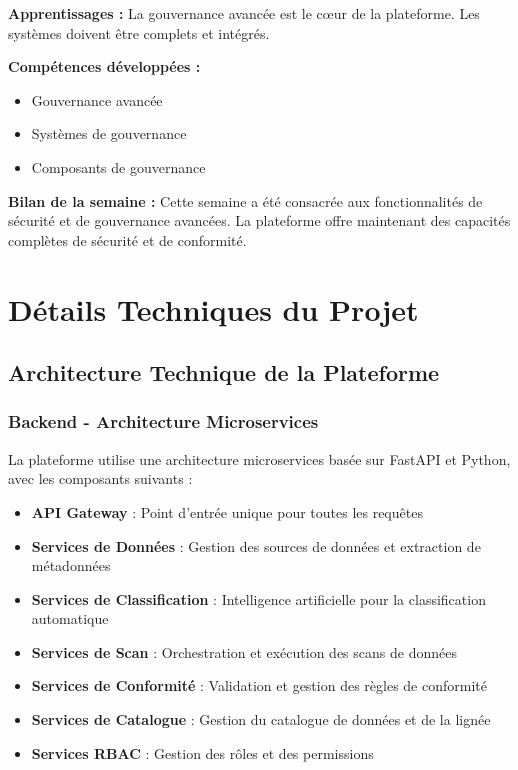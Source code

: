 \documentclass[12pt,a4paper]{article}
\begin{document}
\textbf{Apprentissages :}
La gouvernance avancée est le cœur de la plateforme. Les systèmes doivent être complets et intégrés.

\textbf{Compétences développées :}
\begin{itemize}
    \item Gouvernance avancée
    \item Systèmes de gouvernance
    \item Composants de gouvernance
\end{itemize}

\textbf{Bilan de la semaine :}
Cette semaine a été consacrée aux fonctionnalités de sécurité et de gouvernance avancées. La plateforme offre maintenant des capacités complètes de sécurité et de conformité.


\section{Détails Techniques du Projet}

\subsection{Architecture Technique de la Plateforme}

\subsubsection{Backend - Architecture Microservices}
La plateforme utilise une architecture microservices basée sur FastAPI et Python, avec les composants suivants :

\begin{itemize}
    \item \textbf{API Gateway} : Point d'entrée unique pour toutes les requêtes
    \item \textbf{Services de Données} : Gestion des sources de données et extraction de métadonnées
    \item \textbf{Services de Classification} : Intelligence artificielle pour la classification automatique
    \item \textbf{Services de Scan} : Orchestration et exécution des scans de données
    \item \textbf{Services de Conformité} : Validation et gestion des règles de conformité
    \item \textbf{Services de Catalogue} : Gestion du catalogue de données et de la lignée
    \item \textbf{Services RBAC} : Gestion des rôles et des permissions
\end{itemize}
\end{document}

